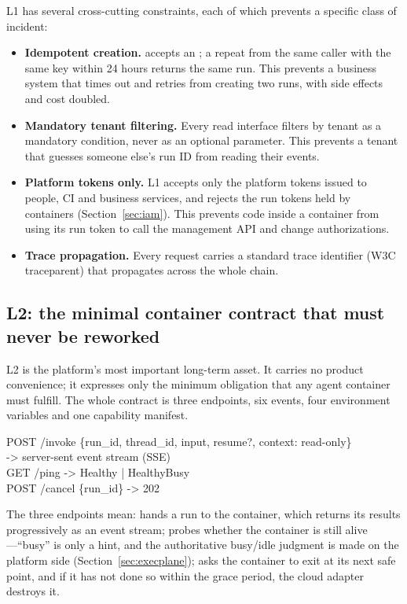 L1 has several cross-cutting constraints, each of which prevents a specific class of incident:

\begin{itemize}
  \item \textbf{Idempotent creation.}  accepts an ; a repeat from the same caller with the same key within 24 hours returns the same run. This prevents a business system that times out and retries from creating two runs, with side effects and cost doubled.
  \item \textbf{Mandatory tenant filtering.} Every read interface filters by tenant as a mandatory condition, never as an optional parameter. This prevents a tenant that guesses someone else's run ID from reading their events.
  \item \textbf{Platform tokens only.} L1 accepts only the platform tokens issued to people, CI and business services, and rejects the run tokens held by containers (Section~\ref{sec:iam}). This prevents code inside a container from using its run token to call the management API and change authorizations.
  \item \textbf{Trace propagation.} Every request carries a standard trace identifier (W3C traceparent) that propagates across the whole chain.
\end{itemize}

\subsection{L2: the minimal container contract that must never be reworked}

L2 is the platform's most important long-term asset. It carries no product convenience; it expresses only the minimum obligation that any agent container must fulfill. The whole contract is three endpoints, six events, four environment variables and one capability manifest.

\begin{codebox}
POST /invoke  \{run\_id, thread\_id, input, resume?, context: read-only\}\\
\hspace*{14ex}-> server-sent event stream (SSE)\\[0.4em]
GET  /ping    -> Healthy | HealthyBusy\\[0.4em]
POST /cancel  \{run\_id\} -> 202
\end{codebox}

The three endpoints mean:  hands a run to the container, which returns its results progressively as an event stream;  probes whether the container is still alive---``busy'' is only a hint, and the authoritative busy/idle judgment is made on the platform side (Section~\ref{sec:execplane});  asks the container to exit at its next safe point, and if it has not done so within the grace period, the cloud adapter destroys it.


